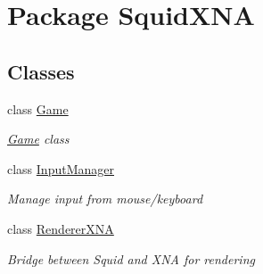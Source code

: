 \hypertarget{namespace_squid_x_n_a}{\section{Package Squid\+X\+N\+A}
\label{namespace_squid_x_n_a}
}
\subsection*{Classes}
\begin{DoxyCompactItemize}
\item 
class \hyperlink{class_squid_x_n_a_1_1_game}{Game}
\begin{DoxyCompactList}\small\item\em \hyperlink{class_squid_x_n_a_1_1_game}{Game} class \end{DoxyCompactList}\item 
class \hyperlink{class_squid_x_n_a_1_1_input_manager}{Input\+Manager}
\begin{DoxyCompactList}\small\item\em Manage input from mouse/keyboard \end{DoxyCompactList}\item 
class \hyperlink{class_squid_x_n_a_1_1_renderer_x_n_a}{Renderer\+X\+N\+A}
\begin{DoxyCompactList}\small\item\em Bridge between Squid and X\+N\+A for rendering \end{DoxyCompactList}\end{DoxyCompactItemize}
